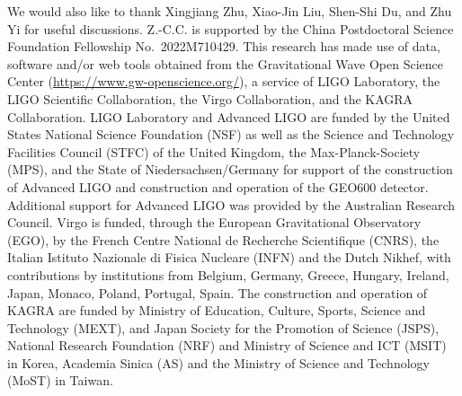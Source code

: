 \documentclass[
reprint,           %
superscriptaddress,%
amsmath,           %
amssymb,           %
aps,               %
prd,               %
notitlepage,       %
longbibliography,  %
floatfix,          %
nofootinbib,
]{revtex4-1}
\begin{document}
\begin{acknowledgments}
We would also like to thank Xingjiang Zhu, Xiao-Jin Liu, Shen-Shi Du, and Zhu Yi for useful discussions.
Z.-C.C. is supported by the China Postdoctoral Science Foundation Fellowship No.~2022M710429.
This research has made use of data, software and/or web tools obtained from the Gravitational Wave Open Science Center (\url{https://www.gw-openscience.org/}), a service of LIGO Laboratory, the LIGO Scientific Collaboration, the Virgo Collaboration, and the KAGRA Collaboration. 
LIGO Laboratory and Advanced LIGO are funded by the United States National Science Foundation (NSF) as well as the Science and Technology Facilities Council (STFC) of the United Kingdom, the Max-Planck-Society (MPS), and the State of Niedersachsen/Germany for support of the construction of Advanced LIGO and construction and operation of the GEO600 detector. Additional support for Advanced LIGO was provided by the Australian Research Council. Virgo is funded, through the European Gravitational Observatory (EGO), by the French Centre National de Recherche Scientifique (CNRS), the Italian Istituto Nazionale di Fisica Nucleare (INFN) and the Dutch Nikhef, with contributions by institutions from Belgium, Germany, Greece, Hungary, Ireland, Japan, Monaco, Poland, Portugal, Spain. The construction and operation of KAGRA are funded by Ministry of Education, Culture, Sports, Science and Technology (MEXT), and Japan Society for the Promotion of Science (JSPS), National Research Foundation (NRF) and Ministry of Science and ICT (MSIT) in Korea, Academia Sinica (AS) and the Ministry of Science and Technology (MoST) in Taiwan.
\end{acknowledgments}	
	

\end{document}
